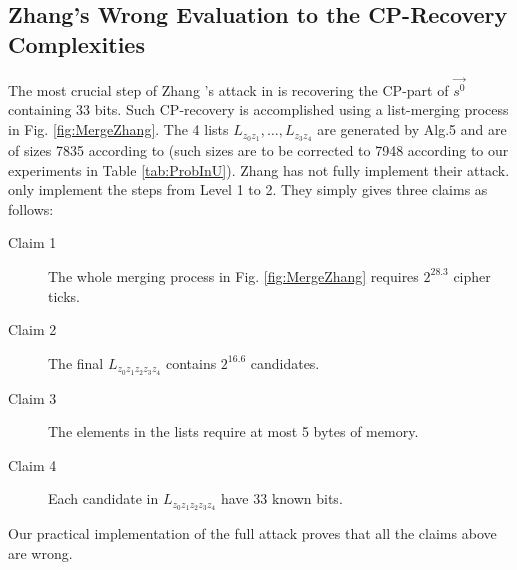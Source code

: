 \subsection{Zhang's Wrong Evaluation to the CP-Recovery Complexities}\label{sec:ZhangWrongCompAnalysis}
The most crucial step of Zhang \etal's attack in \cite{AC:Zhang19} is recovering the CP-part of $\vec{s^0}$ containing 33 bits.
Such CP-recovery is accomplished using a list-merging process in Fig. \ref{fig:MergeZhang}.
The 4 lists $L_{z_0z_1},\ldots, L_{z_3z_4}$ are generated by Alg.5 and are of sizes 7835 according to \cite{AC:Zhang19} (such sizes are to be corrected to 7948 according to our experiments in Table \ref{tab:ProbInU}).
Zhang \etal has not fully implement their attack.
\cite{AC:Zhang19} only implement the steps from Level 1 to 2.
They simply gives three claims as follows:
\begin{description}
  \item[Claim 1] The whole merging process in Fig. \ref{fig:MergeZhang} requires $2^{28.3}$ cipher ticks.
  \item[Claim 2] The final $L_{z_0z_1z_2z_3z_4}$ contains $2^{16.6}$ candidates.
  \item[Claim 3] The elements in the lists require at most 5 bytes of memory.
  \item[Claim 4] Each candidate in $L_{z_0z_1z_2z_3z_4}$ have 33 known bits.
\end{description}
Our practical implementation of the full attack proves that all the claims above are wrong.

